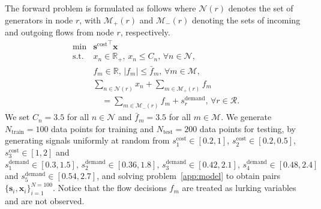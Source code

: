 \documentclass{article}
\def\x{\bm{x}}
\def\s{\bm{s}}
\theoremstyle{plain}
\begin{document}
 

The forward problem is formulated as follows where $\mathcal N(r)$ denotes the set of generators in node $r$, with $\mathcal M_+(r)$ and $\mathcal M_-(r)$ denoting the sets of incoming and outgoing flows from node $r$, respectively.
\begin{equation}\label{app:model}
\begin{array}{ll}
    \min &  {\bm s^{\text{cost}}}^\top \bm x \\
    \text{s.t.} & x_n \in \mathbb{R}_+, \, x_n \leq C_n, \, \forall n \in \mathcal{N}, \\
                &  f_m \in \mathbb{R}, \, |f_m| \leq \bar{f}_m, \, \forall m \in \mathcal{M}, \\
                &  \sum_{n \in \mathcal{N}(r)} x_n + \sum_{m \in \mathcal{M}_+(r)} f_m \\
                & \quad = \sum_{m \in \mathcal{M}_-(r)} f_m + s_r^{\text{demand}}, \, \forall r \in \mathcal{R}.
\end{array}
\end{equation}
We set $C_n = 3.5$ for all $n\in\mathcal{N}$ and $\bar{f}_m = 3.5$ for all $m \in \mathcal M$.  We generate $N_{\text{train}} = 100$ data points  for training and $N_{\text{test}} = 200$ data points for testing, by generating signals uniformly at random from $s^{\text{cost}}_1\in[0.2, 1]$, $s^{\text{cost}}_2\in [0.2, 0.5]$,  $s^{\text{cost}}_3\in[1, 2]$ and $s^{\text{demand}}_1\in[0.3, 1.5],\,s^{\text{demand}}_2\in[0.36,1.8],\,s^{\text{demand}}_3\in[0.42,2.1],\,s^{\text{demand}}_4\in [0.48,2.4]$ and $s^{\text{demand}}_5\in [0.54, 2.7]$, and solving problem~\eqref{app:model} to obtain pairs $\{\s_i,\x_i\}_{i = 1}^{N=100}$. Notice that the flow decisions $f_m$ are treated as lurking variables and are not observed.
\end{document}

